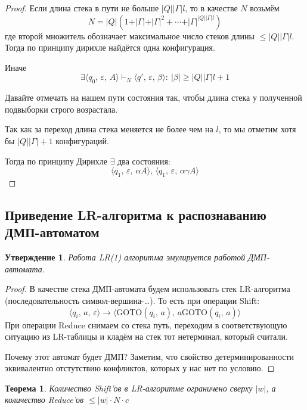 \documentclass[a4paper,12pt]{article}
\renewcommand{\leq}{\ensuremath{\leqslant}}
\renewcommand{\geq}{\ensuremath{\geqslant}}
\theoremstyle{plain}
\newtheorem{theorem}{Теорема}[subsection]
\newtheorem{proposition}{Утверждение}[subsection]
\theoremstyle{definition}
\theoremstyle{remark}
\begin{document}
\begin{proof}
	Если длина стека в пути не больше $\vert Q\vert\vert\Gamma\vert l$, то в качестве $N$ возьмём
	\[
		N = \vert Q\vert(1 + \vert \Gamma\vert + \vert\Gamma\vert^2 +\cdots + \vert\Gamma\vert^{\vert Q\vert\vert\Gamma\vert l})
	\]
	где второй множитель обозначает максимальное число стеков длины $\leq \vert Q\vert\vert\Gamma\vert l$. Тогда по принципу дирихле найдётся одна конфигурация.

	Иначе
	\[
		\exists \langle q_0,\,\varepsilon,\,A\rangle\vdash_N\langle q',\,\varepsilon,\,\beta\rangle :\: \vert\beta\vert \geq \vert Q\vert\vert\Gamma\vert l + 1
	\]

	Давайте отмечать на нашем пути состояния так, чтобы длина стека у полученной подвыборки строго возрастала.

	Так как за переход длина стека меняется не более чем на $l$, то мы отметим хотя бы $\vert Q\vert\vert\Gamma\vert +1$ конфигураций.

	Тогда по принципу Дирихле $\exists$ два состояния:
	\[
		\langle q_1,\, \varepsilon,\, \alpha A\rangle,\,\langle q_1,\, \varepsilon,\, \alpha\gamma A\rangle
	\]
\end{proof}

\subsection{Приведение LR-алгоритма к распознаванию ДМП-автоматом}
\begin{proposition}
	Работа LR(1) алгоритма эмулируется работой ДМП-автомата.
\end{proposition}

\begin{proof}
	В качестве стека ДМП-автомата будем использовать стек LR-алгоритма (последовательность символ-вершина-\dots). То есть при операции Shift:
	\[
		\langle q_i,\, a,\, \varepsilon\rangle \to \langle \text{GOTO}(q_i,\, a),\, a\text{GOTO}(q_i,\, a)\rangle
	\]
	При операции Reduce снимаем со стека путь, переходим в соответствующую ситуацию из LR-таблицы и кладём на стек тот нетерминал, который считали.

	Почему этот автомат будет ДМП? Заметим, что свойство детерминированности эквивалентно отстутствию конфликтов, которых у нас нет по условию.
\end{proof}

\begin{theorem}
	Количество Shift'ов в LR-алгоритме ограничено сверху $\vert w\vert$, а количество Reduce'ов $\leq \vert w\vert\cdot N\cdot c$
\end{theorem}
\end{document}
